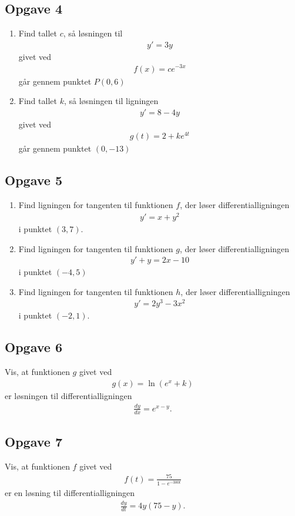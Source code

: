 \subsection*{Opgave 4}
\begin{enumerate}[label=\roman*)]
	\item Find tallet $c$, så løsningen til 
	\begin{align*}
		y' = 3y
	\end{align*}
	givet ved
	\begin{align*}
		f(x) = ce^{-3x}
	\end{align*}
	går gennem punktet $P(0,6)$
	\item Find tallet $k$, så løsningen til ligningen 
	\begin{align*}
		y' = 8 - 4y
	\end{align*}
	givet ved
	\begin{align*}
		g(t) = 2 + ke^{4t}
	\end{align*}
	går gennem punktet $(0,-13)$
\end{enumerate}

\subsection*{Opgave 5}
\begin{enumerate}[label=\roman*)]
	\item Find ligningen for tangenten til funktionen $f$, der løser differentialligningen 
	\begin{align*}
		y' = x + y^2
	\end{align*}
	i punktet $(3,7)$.
	\item Find ligningen for tangenten til funktionen $g$, der løser differentialligningen
	\begin{align*}
		y' + y = 2x - 10
	\end{align*}
	i punktet $(-4,5)$
	\item Find ligningen for tangenten til funktionen $h$, der løser differentialligningen
	\begin{align*}
		y' = 2y^3 - 3x^2
	\end{align*}
	i punktet $(-2,1)$.
\end{enumerate}

\subsection*{Opgave 6}
Vis, at funktionen $g$ givet ved
\begin{align*}
	g(x) = \ln(e^{x} + k)
\end{align*}
er løsningen til differentialligningen
\begin{align*}
	\frac{d y}{d x} = e^{x-y}.
\end{align*}

\subsection*{Opgave 7}
Vis, at funktionen $f$ givet ved 
\begin{align*}
	f(t) = \frac{75}{1 - e^{-300t}}
\end{align*}
er en løsning til differentialligningen 
\begin{align*}
		\frac{dy}{dt} = 4y(75 - y).
\end{align*}
